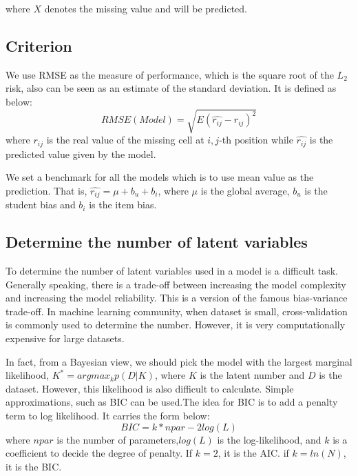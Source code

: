 \documentclass[11pt]{article}
\begin{document}

where $X$ denotes the missing value and will be predicted.  

\subsection{Criterion}
We use RMSE as the measure of performance, which is the square root of the $L_2$ risk, also can be seen as an estimate of the standard deviation. It is defined as below:
$$RMSE(Model)=\sqrt{E(\hat{r_{ij}}-r_{ij})^2}$$
where $r_{ij}$ is the real value of the missing cell at $i,j$-th position while $\hat{r_{ij}}$ is the predicted value given by the model.

We set a benchmark for all the models which is to use mean value as the prediction. That is, $\hat{r_{ij}}=\mu+b_u+b_i$, where $\mu$ is the global average, $b_u$ is the student bias and $b_i$ is the item bias.

\subsection{Determine the number of latent variables}
To determine the number of latent variables used in a model is a difficult task. Generally speaking, there is a trade-off between increasing the model complexity and increasing the model reliability\cite{dibello200631a}. This is a version of the famous bias-variance trade-off\cite{friedman2001elements}. In machine learning community, when dataset is small, cross-validation is commonly used to determine the number. However, it is very computationally expensive for large datasets. 

In fact, from a Bayesian view, we should pick the model with the largest marginal likelihood, $K^{*}=argmax_kp(D|K)$, where $K$ is the latent number and $D$ is the dataset\cite{murphy2012machine}. However, this likelihood is also difficult to calculate. Simple approximations, such as BIC can be used\cite{fraley2002model}.The idea for BIC is to add a penalty term to log likelihood. It carries the form below: 
$$ BIC = k*npar - 2log(L) $$
where $npar$ is the number of parameters,$log(L)$ is the log-likelihood, and $k$ is a coefficient to decide the degree of penalty. If $k=2$, it is the AIC. if $k=ln(N)$, it is the BIC. 
\end{document}
